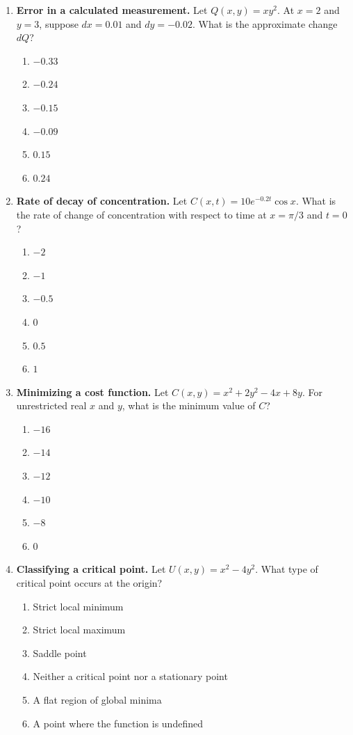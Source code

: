 \documentclass[a4paper,12pt]{article}
\theoremstyle{mystyle}
\numberwithin{equation}{section}
\numberwithin{theorem}{section}
\numberwithin{proposition}{section}
\numberwithin{example}{section}
\numberwithin{remark}{section}
\numberwithin{lemma}{section}
\numberwithin{corollary}{section}
\numberwithin{definition}{section}
\begin{document}
\begin{enumerate}[label=\textbf{Question \arabic*.},leftmargin=*]
\item \textbf{Error in a calculated measurement.} Let $Q(x,y)=xy^2$. At $x=2$ and $y=3$, suppose $dx=0.01$ and $dy=-0.02$. What is the approximate change $dQ$?
\begin{enumerate}[label=(\Alph*)]
\item $-0.33$
\item $-0.24$
\item $-0.15$
\item $-0.09$
\item $0.15$
\item $0.24$
\end{enumerate}

\item \textbf{Rate of decay of concentration.} Let $C(x,t)=10e^{-0.2t}\cos x$. What is the rate of change of concentration with respect to time at $x=\pi/3$ and $t=0$?
\begin{enumerate}[label=(\Alph*)]
\item $-2$
\item $-1$
\item $-0.5$
\item $0$
\item $0.5$
\item $1$
\end{enumerate}

\item \textbf{Minimizing a cost function.} Let $C(x,y)=x^2+2y^2-4x+8y$. For unrestricted real $x$ and $y$, what is the minimum value of $C$?
\begin{enumerate}[label=(\Alph*)]
\item $-16$
\item $-14$
\item $-12$
\item $-10$
\item $-8$
\item $0$
\end{enumerate}

\item \textbf{Classifying a critical point.} Let $U(x,y)=x^2-4y^2$. What type of critical point occurs at the origin?
\begin{enumerate}[label=(\Alph*)]
\item Strict local minimum
\item Strict local maximum
\item Saddle point
\item Neither a critical point nor a stationary point
\item A flat region of global minima
\item A point where the function is undefined
\end{enumerate}


\end{enumerate}
\end{document}
